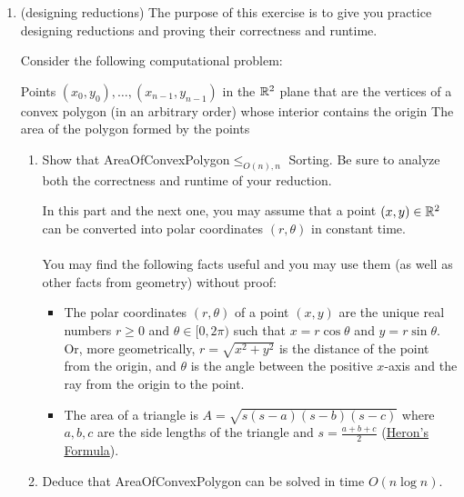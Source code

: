 \documentclass[11pt]{article}
\begin{document}
\begin{enumerate}
     \item  (designing reductions) The purpose of this exercise is to give you practice designing reductions and proving their correctness and runtime.

    Consider the following computational problem:

    {Points $(x_0,y_0),\ldots,(x_{n-1},y_{n-1})$ in the $\mathbb{R}^2$ plane that are the vertices of a convex polygon (in an arbitrary order) whose interior contains the origin}
    {The area of the polygon formed by the points}

    \begin{enumerate}
        \item \label{part:polar} 
        Show that AreaOfConvexPolygon$\leq_{O(n),n}$ Sorting.  Be sure to analyze both the correctness and runtime of your reduction.

        In this part and the next one, you may assume that a point $(x,y)\in \mathbb{R}^2$ can be converted into polar coordinates $(r,\theta)$ in constant time. 
        \\\\
        You may find the following facts useful and you may use them (as well as other facts from geometry) without proof:
        
        \begin{itemize}
            \item The polar coordinates $(r,\theta)$ of a point $(x,y)$ are the unique real numbers $r\geq 0$ and $\theta\in [0,2\pi)$ such that $x=r\cos \theta$ and $y=r\sin \theta$. Or, more geometrically, $r=\sqrt{x^2+y^2}$ is the distance of the point from the origin, and $\theta$ is the angle between the positive $x$-axis and the ray from the origin to the point.
            \item The area of a triangle is $A = \sqrt{s(s-a)(s-b)(s-c)}$ where $a, b, c$ are the side lengths of the triangle and $s = \frac{a + b + c}{2}$ (\href{https://en.wikipedia.org/wiki/Heron\%27s_formula}{Heron's Formula}).
        \end{itemize}

        
        
        \item Deduce that AreaOfConvexPolygon can be solved in time $O(n\log n)$.
      

\end{enumerate}
\end{enumerate}
\end{document}
